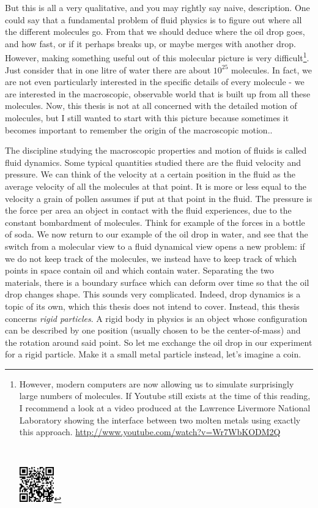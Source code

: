 \documentclass[thesis.tex]{subfiles}
\begin{document}
But this is all a very qualitative, and you may rightly say naive, description. One could say that a fundamental problem of fluid physics is to figure out where all the different molecules go. From that we should deduce where the oil drop goes, and how fast, or if it perhaps breaks up, or maybe merges with another drop. However, making something useful out of this molecular picture is very difficult\footnote{
\begin{minipage}[l]{9cm}
However, modern computers are now allowing us to simulate surprisingly large numbers of molecules. If Youtube still exists at the time of this reading, I recommend a look at a video produced at the Lawrence Livermore National Laboratory showing the interface between two molten metals using exactly this approach. \url{http://www.youtube.com/watch?v=Wr7WbKODM2Q}
\end{minipage}\,\,
\begin{minipage}[l]{1.5cm}
\includegraphics[width=1.5cm]{figs/ninebillion_qr.png}
\end{minipage}
}.
Just consider that in one litre of water there are about $10^{25}$ molecules. In fact, we are not even particularly interested in the specific details of every molecule - we are interested in the macroscopic, observable world that is built up from all these molecules. Now, this thesis is not at all concerned with the detailed motion of molecules, but I still wanted to start with this picture because sometimes it becomes important to remember the origin of the macroscopic motion..

The discipline studying the macroscopic properties and motion of fluids is called fluid dynamics. Some typical quantities studied there are the fluid velocity and pressure. We can think of the velocity at a certain position in the fluid as the average velocity of all the molecules at that point. It is more or less equal to the velocity a grain of pollen assumes if put at that point in the fluid. The pressure is the force per area an object in contact with the fluid experiences, due to the constant bombardment of molecules. Think for example of the forces in a bottle of soda. We now return to our example of the oil drop in water, and see that the switch from a molecular view to a fluid dynamical view opens a new problem: if we do not keep track of the molecules, we instead have to keep track of which points in space contain oil and which contain water. Separating the two materials, there is a boundary surface which can deform over time so that the oil drop changes shape. This sounds very complicated. Indeed, drop dynamics is a topic of its own, which this thesis does not intend to cover. Instead, this thesis concerns \emph{rigid particles}. A rigid body in physics is an object whose configuration can be described by one position (usually chosen to be the center-of-mass) and the rotation around said point. So let me exchange the oil drop in our experiment for a rigid particle. Make it a small metal particle instead, let's imagine a coin. 

 	


 
\end{document}
